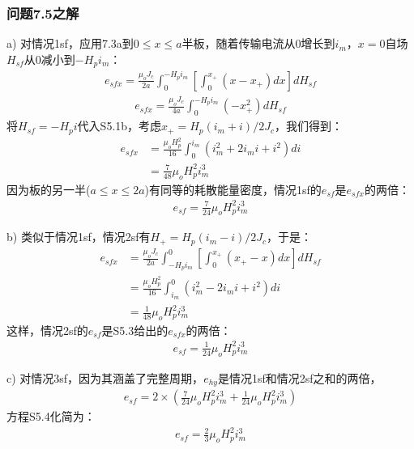 \subsubsection{问题7.5之解}
a) 对情况1sf，应用7.3a到$0\le x\le a$半板，随着传输电流从0增长到$i_m$，$x=0$自场$H_{sf}$从0减小到$-H_p i_m$：
\begin{align*}%
e_{sfx}=\frac{\mu_oJ_c}{2a}\int_{0}^{-H_pi_m}\left[\int_{0}^{x_+}(x-x_+)dx\right]dH_{sf}  \tag{S5.1a}
\end{align*}
\begin{align*}
e_{sfx}=\frac{\mu_oJ_c}{4a}\int_{0}^{-H_pi_m}(-x_{+}^{2})dH_{sf} \tag{S5.1b}
\end{align*}
将$H_{sf}=-H_p i$代入S5.1b，考虑$x_+=H_p(i_m+i)/2J_c$，我们得到：
\begin{align*}%
e_{sfx}&=\frac{\mu_oH_{p}^{2}}{16}\int_{0}^{i_m}(i_{m}^{2}+2i_mi+i^2)di \\
&=\frac{7}{48}\mu_oH_{p}^{2}i_{m}^{3} \tag{S5.2}
\end{align*}
因为板的另一半($a\le x\le 2a$)有同等的耗散能量密度，情况1sf的$e_{sf}$是$e_{sfx}$的两倍：
\begin{align*}%
e_{sf}=\frac{7}{24}\mu_oH_{p}^{2}i_{m}^{3} \tag{7.26a}
\end{align*}

b) 类似于情况1sf，情况2sf有$H_+=H_p(i_m-i)/2J_c$，于是：
\begin{align*}%
e_{sfx}&=\frac{\mu_oJ_c}{2a}\int_{-H_pi_m}^{0}\left[\int_{0}^{x_+}(x_+-x)dx\right]dH_{sf} \\
&=\frac{\mu_oH_{p}^{2}}{16}\int_{i_m}^{0}(i_{m}^{2}-2i_mi+i^2)di \\
&=\frac{1}{48}\mu_oH_{p}^{2}i_{m}^{3} \tag{S5.3c}
\end{align*}
这样，情况2sf的$e_{sf}$是S5.3给出的$e_{sfx}$的两倍：
\begin{align*}%
e_{sf}=\frac{1}{24}\mu_oH_{p}^{2}i_{m}^{3} \tag{7.26b}
\end{align*}

c) 对情况3sf，因为其涵盖了完整周期，$e_{hy}$是情况1sf和情况2sf之和的两倍，
\begin{align*}%
e_{sf}=2\times\left(\frac{7}{24}\mu_oH_{p}^{2}i_{m}^{3}+\frac{1}{24}\mu_oH_{p}^{2}i_{m}^{3}\right) \tag{S5.4}
\end{align*}
方程S5.4化简为：
\begin{align*}%
e_{sf}=\frac{2}{3}\mu_oH_{p}^{2}i_{m}^{3} \tag{7.26c}
\end{align*}

